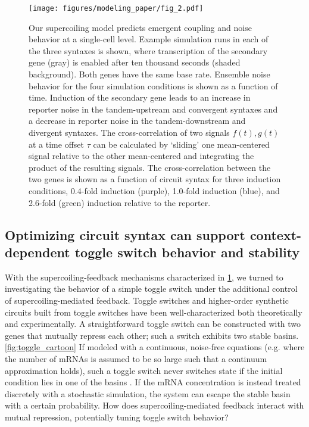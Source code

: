 \documentclass[11pt]{article}
\begin{document}
\begin{figure}[h]
    \centering
    {\texttt{[image: figures/modeling\_paper/fig\_2.pdf]}
    \label{fig:orientation_examples}
    \label{fig:noise_by_orientation}
    \label{fig:cross_correlation_cartoon}
    \label{fig:orientation_cross_correlation}}
    \caption{Our supercoiling model predicts emergent coupling and noise behavior at a single-cell level.
         Example simulation runs in each of the three syntaxes is shown, where transcription of the secondary gene (gray) is enabled after ten thousand seconds (shaded background). Both genes have the same base rate.
         Ensemble noise behavior for the four simulation conditions is shown as a function of time. Induction of the secondary gene leads to an increase in reporter noise in the tandem-upstream and convergent syntaxes and a decrease in reporter noise in the tandem-downstream and divergent syntaxes.
         The cross-correlation of two signals \(f(t), g(t)\) at a time offset \(\tau\) can be calculated by `sliding' one mean-centered signal relative to the other mean-centered and integrating the product of the resulting signals.
         The cross-correlation between the two genes is shown as a function of circuit syntax for three induction conditions, 0.4-fold induction (purple), 1.0-fold induction (blue), and 2.6-fold (green) induction relative to the reporter.
    } \label{fig:top:single_cell_noise_correlation}
\end{figure}

\subsection{Optimizing circuit syntax can support context-dependent toggle switch behavior and stability}
With the supercoiling-feedback mechanisms characterized in \cref{fig:top:single_cell_noise_correlation}, we turned to investigating the behavior of a simple toggle switch under the additional control of supercoiling-mediated feedback.
Toggle switches and higher-order synthetic circuits built from toggle switches have been well-characterized both theoretically \parencite{gardnerConstructionGeneticToggle2000} and experimentally.\parencite{zhuSyntheticMultistabilityMammalian2021} %
A straightforward toggle switch can be constructed with two genes that mutually repress each other; such a switch exhibits two stable basins.\cref{fig:toggle_cartoon} If modeled with a continuous, noise-free equations (e.g. where the number of mRNAs is assumed to be so large such that a continuum approximation holds), such a toggle switch never switches state if the initial condition lies in one of the basins \parencite{gardnerConstructionGeneticToggle2000}. If the mRNA concentration is instead treated discretely with a stochastic simulation, the system can escape the stable basin with a certain probability. How does supercoiling-mediated feedback interact with mutual repression, potentially tuning toggle switch behavior?
\end{document}
